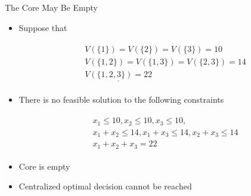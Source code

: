 \documentclass[14pt]{beamer}
\begin{document}
\begin{frame}{The Core May Be Empty}
\begin{itemize}
\small
	\item Suppose that

\vspace{-1.5em}
  \begin{eqnarray*}
    \begin{aligned}
  &V(\{1\}) = V(\{2\}) = V(\{3\}) = 10 \\
  &V(\{1,2\}) = V(\{1,3\}) = V(\{2,3\}) = 14 \\
  &\underline{V(\{1,2,3\}) = 22}
    \end{aligned}
  \end{eqnarray*}
\vspace{-1.5em}

  \item There is no feasible solution to the following constraints

  \vspace{-1.5em}
    \begin{eqnarray*}
      \begin{aligned}
    &x_1 \leq 10, x_2 \leq 10, x_3 \leq 10,   \\
    &x_1 + x_2 \leq 14, x_1 + x_3 \leq 14, x_2 + x_3 \leq 14\\
    &x_1 + x_2 + x_3  = 22
      \end{aligned}
    \end{eqnarray*}
  \vspace{-1.5em}

  \item  Core is empty
  \item  Centralized optimal decision cannot be reached

\end{itemize}
\end{frame}
\end{document}
